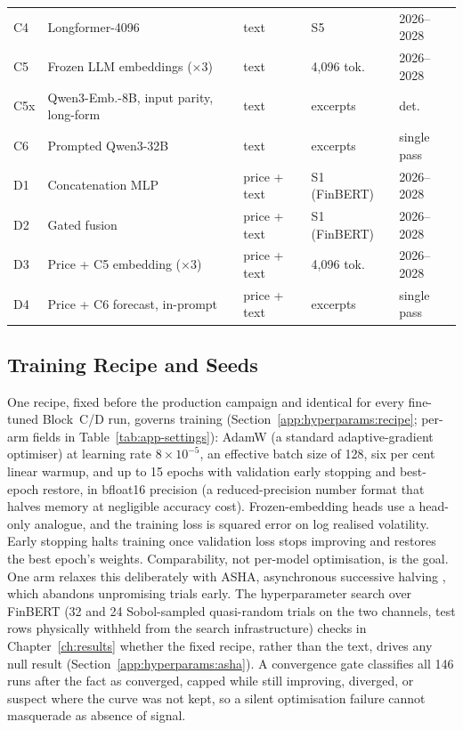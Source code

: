 \begin{table}[htbp]
\begin{tabular}{@{}lllll@{}}
C4 & Longformer-4096 \cite{beltagy2020longformer} & text & S5 & 2026--2028 \\
C5 & Frozen LLM embeddings ($\times$3) & text & 4{,}096 tok. & 2026--2028 \\
C5x & Qwen3-Emb.-8B, input parity, long-form & text & excerpts & det. \\
C6 & Prompted Qwen3-32B \cite{qwen3_2025} & text & excerpts & single pass \\
\midrule
D1 & Concatenation MLP & price + text & S1 (FinBERT) & 2026--2028 \\
D2 & Gated fusion & price + text & S1 (FinBERT) & 2026--2028 \\
D3 & Price + C5 embedding ($\times$3) & price + text & 4{,}096 tok. & 2026--2028 \\
D4 & Price + C6 forecast, in-prompt & price + text & excerpts & single pass \\
\bottomrule
\end{tabular}
\end{table}

\subsection{Training Recipe and Seeds}
\label{sec:design-training}

One recipe, fixed before the production campaign and identical for every fine-tuned Block~C/D run, governs training (Section~\ref{app:hyperparams:recipe}; per-arm fields in Table~\ref{tab:app-settings}): AdamW (a standard adaptive-gradient optimiser) at learning rate $8\times10^{-5}$, an effective batch size of 128, six per cent linear warmup, and up to 15 epochs with validation early stopping and best-epoch restore, in bfloat16 precision (a reduced-precision number format that halves memory at negligible accuracy cost). Frozen-embedding heads use a head-only analogue, and the training loss is squared error on log realised volatility. %
Early stopping halts training once validation loss stops improving and restores the best epoch's weights. Comparability, not per-model optimisation, is the goal. One arm relaxes this deliberately with ASHA, asynchronous successive halving \cite{li2020asha}, which abandons unpromising trials early. The hyperparameter search over FinBERT (32 and 24 Sobol-sampled quasi-random trials \cite{sobol1967distribution} on the two channels, test rows physically withheld from the search infrastructure) checks in Chapter~\ref{ch:results} whether the fixed recipe, rather than the text, drives any null result (Section~\ref{app:hyperparams:asha}). %
A convergence gate classifies all 146 runs after the fact as converged, capped while still improving, diverged, or suspect where the curve was not kept, so a silent optimisation failure cannot masquerade as absence of signal. %

